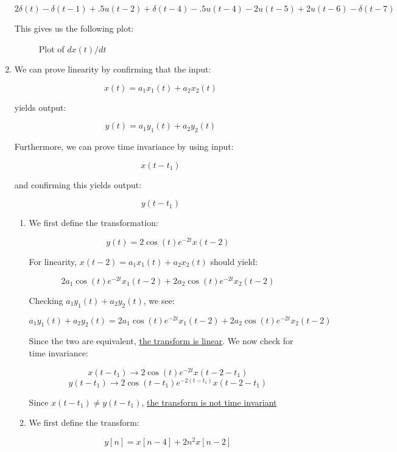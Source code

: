 \begin{enumerate}
    $$\boxed{2\delta(t)-\delta(t-1)+.5u(t-2)+\delta(t-4)-.5u(t-4)-2u(t-5)+2u(t-6)-\delta(t-7)}$$

    This gives us the following plot:

    \begin{figure}[H]
      \centering
      
      \caption{Plot of $dx(t)/dt$}
      \label{fig:6}
    \end{figure}

  \item

    We can prove linearity by confirming that the input:

    $$x(t)=a_1x_1(t)+a_2x_2(t)$$

    yields output:

    $$y(t)=a_1y_1(t)+a_2y_2(t)$$

    Furthermore, we can prove time invariance by using input:

    $$x(t-t_1)$$

    and confirming this yields output:

    $$y(t-t_1)$$

    \begin{enumerate}[label=\textbf{\alph*)}]

      \item 

        We first define the transformation:

        $$y(t)=2\cos(t)e^{-2t}x(t-2)$$

        For linearity, $x(t-2)=a_1x_1(t)+a_2x_2(t)$ should yield:

        $$2a_1\cos(t)e^{-2t}x_1(t-2)+2a_2\cos(t)e^{-2t}x_2(t-2)$$

        Checking $a_1y_1(t)+a_2y_2(t)$, we see:

        $$a_1y_1(t)+a_2y_2(t)=2a_1\cos(t)e^{-2t}x_1(t-2)+2a_2\cos(t)e^{-2t}x_2(t-2)$$

        Since the two are equivalent, \underline{the transform is linear}. We now check for time invariance:

        $$x(t-t_1)\to2\cos(t)e^{-2t}x(t-2-t_1)$$
        $$y(t-t_1)\to2\cos(t-t_1)e^{-2(t-t_1)}x(t-2-t_1)$$

        Since $x(t-t_1)\neq y(t-t_1)$, \underline{the transform is not time invariant}

      \item 

        We first define the transform:

        $$y[n]=x[n-4]+2n^2x[n-2]$$


\end{enumerate}
\end{enumerate}
